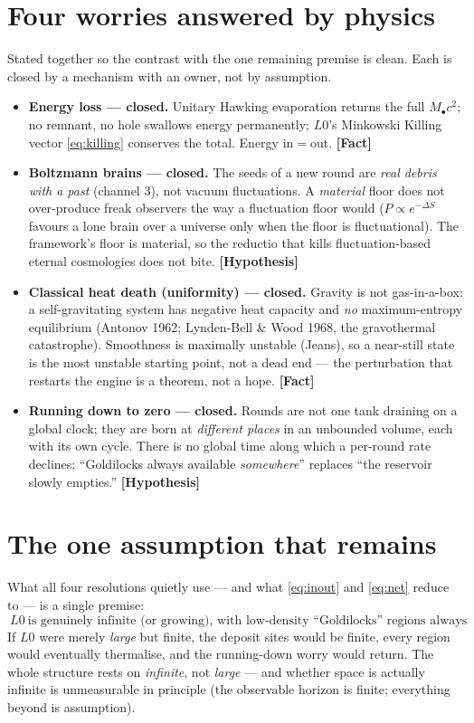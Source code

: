 \documentclass[11pt]{article}
\newcommand{\Fact}{\textbf{\textcolor{green!45!black}{[Fact]}}}
\newcommand{\Hyp}{\textbf{\textcolor{blue!55!black}{[Hypothesis]}}}
\newcommand{\Mbh}{M_{\bullet}}
\begin{document}
\section{Four worries answered by physics}
Stated together so the contrast with the one remaining premise is clean. Each is closed by a mechanism with an owner, not by assumption.
\begin{itemize}[leftmargin=1.35em,itemsep=3pt]
\item \textbf{Energy loss --- closed.} Unitary Hawking evaporation returns the full $\Mbh c^2$; no remnant, no hole swallows energy permanently; $L0$'s Minkowski Killing vector \eqref{eq:killing} conserves the total. Energy in$=$out. \Fact
\item \textbf{Boltzmann brains --- closed.} The seeds of a new round are \emph{real debris with a past} (channel 3), not vacuum fluctuations. A \emph{material} floor does not over-produce freak observers the way a fluctuation floor would ($P\!\propto\!e^{-\Delta S}$ favours a lone brain over a universe only when the floor is fluctuational). The framework's floor is material, so the reductio that kills fluctuation-based eternal cosmologies does not bite. \Hyp
\item \textbf{Classical heat death (uniformity) --- closed.} Gravity is not gas-in-a-box: a self-gravitating system has negative heat capacity and \emph{no} maximum-entropy equilibrium (Antonov 1962; Lynden-Bell \& Wood 1968, the gravothermal catastrophe). Smoothness is maximally unstable (Jeans), so a near-still state is the most unstable starting point, not a dead end --- the perturbation that restarts the engine is a theorem, not a hope. \Fact
\item \textbf{Running down to zero --- closed.} Rounds are not one tank draining on a global clock; they are born at \emph{different places} in an unbounded volume, each with its own cycle. There is no global time along which a per-round rate declines; ``Goldilocks always available \emph{somewhere}'' replaces ``the reservoir slowly empties.'' \Hyp
\end{itemize}

\section{The one assumption that remains}
What all four resolutions quietly use --- and what \eqref{eq:inout} and \eqref{eq:net} reduce to --- is a single premise:
\begin{equation}
\boxed{\ L0\ \text{is genuinely infinite (or growing), with low-density ``Goldilocks'' regions always remaining.}\ }
\end{equation}
If $L0$ were merely \emph{large} but finite, the deposit sites would be finite, every region would eventually thermalise, and the running-down worry would return. The whole structure rests on \emph{infinite}, not \emph{large} --- and whether space is actually infinite is unmeasurable in principle (the observable horizon is finite; everything beyond is assumption).
\end{document}
